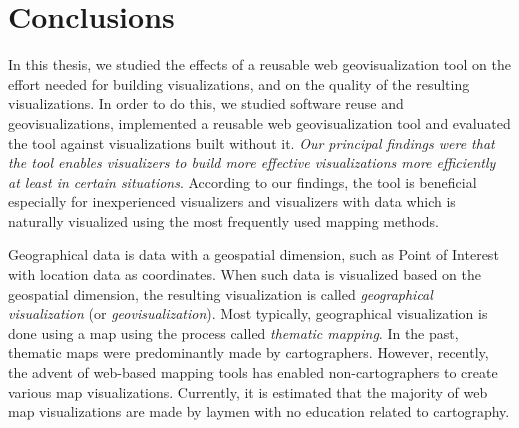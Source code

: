 
\chapter{Conclusions}
\label{chapter:conclusions}

In this thesis, we studied the effects of a reusable web geovisualization tool on the effort needed for building visualizations, and on the quality of the resulting visualizations. In order to do this, we studied software reuse and geovisualizations, implemented a reusable web geovisualization tool and evaluated the tool against visualizations built without it. \emph{Our principal findings were that the tool enables visualizers to build more effective visualizations more efficiently at least in certain situations}. According to our findings, the tool is beneficial especially for inexperienced visualizers and visualizers with data which is naturally visualized using the most frequently used mapping methods.

Geographical data is data with a geospatial dimension, such as Point of Interest with location data as coordinates. When such data is visualized based on the geospatial dimension, the resulting visualization is called \emph{geographical visualization} (or \emph{geovisualization}). Most typically, geographical visualization is done using a map using the process called \emph{thematic mapping}. In the past, thematic maps were predominantly made by cartographers. However, recently, the advent of web-based mapping tools has enabled non-cartographers to create various map visualizations. Currently, it is estimated that the majority of web map visualizations are made by laymen with no education related to cartography.



